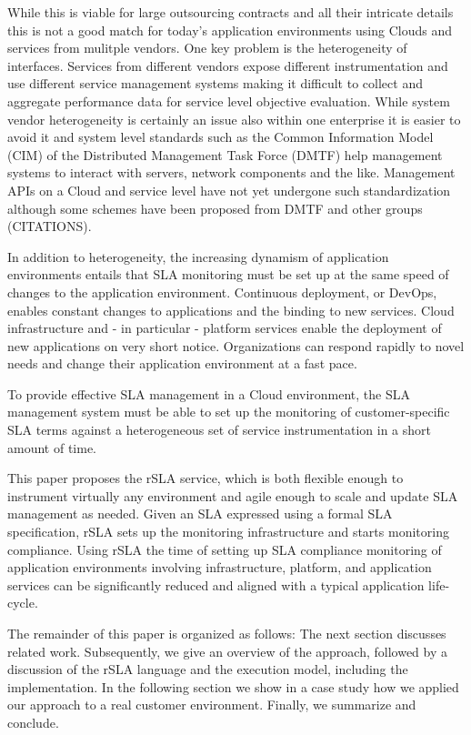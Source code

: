 While this is viable for large outsourcing contracts and all their intricate details this is not a good match for today's application environments using Clouds and services from mulitple vendors. 
One key problem is the heterogeneity of interfaces.  Services from different vendors expose different instrumentation and use different service management systems making it difficult to collect and aggregate performance data for service level objective evaluation. While system vendor heterogeneity is certainly an issue also within one enterprise it is easier to avoid it and system level standards such as the Common Information Model (CIM) of the Distributed Management Task Force (DMTF) help management systems to interact with servers, network components and the like. Management APIs on a Cloud and service level have not yet undergone such standardization although some schemes have been proposed from DMTF and other groups (CITATIONS).

In addition to heterogeneity, the increasing dynamism of application environments entails that SLA monitoring must be set up at the same speed of changes to the 
application environment. Continuous deployment, or DevOps, enables constant changes to applications and the binding to new services. Cloud infrastructure and - in particular - platform services enable the deployment of new applications on very short notice. Organizations can respond rapidly to novel needs and change their application environment at a fast pace.

To provide effective SLA management in a Cloud environment, the SLA management system must be able to set up the monitoring of customer-specific SLA terms against a heterogeneous set of service instrumentation in a short amount of time. 

This 
paper proposes the rSLA service, which is both flexible enough to instrument virtually any environment and agile enough to scale and update SLA management as needed. Given an SLA 
expressed using a formal SLA specification, rSLA sets up the monitoring infrastructure and starts monitoring compliance. Using rSLA the time of setting up SLA compliance monitoring 
of application environments involving infrastructure, platform, and application services can be significantly reduced and aligned with a typical application life-cycle.

The remainder of this paper is organized as follows: The next section discusses related work. Subsequently, we give an overview of the approach, followed by a discussion of the rSLA language and the execution model, including the implementation. In the following section we show in a case study how we applied our approach to a real customer environment. Finally, we summarize and conclude.







